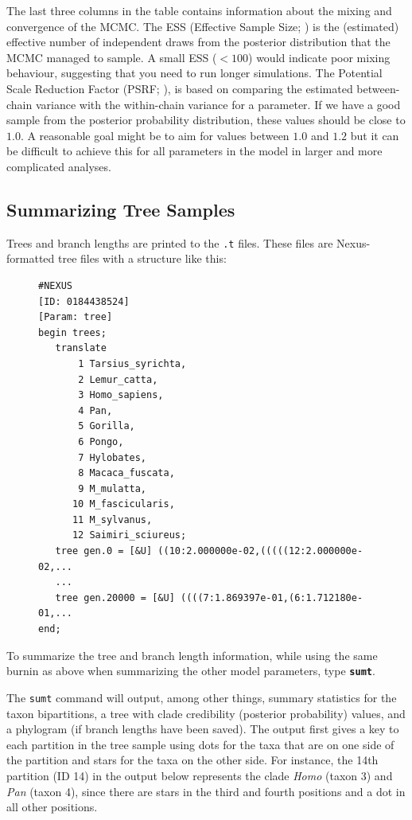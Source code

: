 \documentclass[12pt]{book}
\newcommand{\ttt}[1]{\texttt{#1}}
\newcommand{\tb}[1]{\ttt{\textbf{#1}}}
\begin{document}
The last three columns in the table contains information about the mixing and convergence of the
MCMC. The ESS (Effective Sample Size; \citet{ripley87}) is the (estimated) effective number of
independent draws from the posterior distribution that the MCMC managed to sample. A small ESS
($<100$) would indicate poor mixing behaviour, suggesting that you need to run longer simulations.
The Potential Scale Reduction Factor (PSRF; \citet{gelman92}), is based on comparing the estimated
between-chain variance with the within-chain variance for a parameter. If we have a good sample
from the posterior probability distribution, these values should be close to $1.0$. A reasonable
goal might be to aim for values between $1.0$ and $1.2$ but it can be difficult to achieve this
for all parameters in the model in larger and more complicated analyses.

\subsection{Summarizing Tree Samples}

Trees and branch lengths are printed to the \texttt{.t} files. These files are Nexus-formatted tree
files with a structure like this:

\begin{figure}[H]
\centering
\begin{BVerbatim}
#NEXUS
[ID: 0184438524]
[Param: tree]
begin trees;
   translate
       1 Tarsius_syrichta,
       2 Lemur_catta,
       3 Homo_sapiens,
       4 Pan,
       5 Gorilla,
       6 Pongo,
       7 Hylobates,
       8 Macaca_fuscata,
       9 M_mulatta,
      10 M_fascicularis,
      11 M_sylvanus,
      12 Saimiri_sciureus;
   tree gen.0 = [&U] ((10:2.000000e-02,(((((12:2.000000e-02,...
   ...
   tree gen.20000 = [&U] ((((7:1.869397e-01,(6:1.712180e-01,...
end;
\end{BVerbatim}
\end{figure}

To summarize the tree and branch length information, while using the same burnin as above when
summarizing the other model parameters, type \tb{sumt}.

The \texttt{sumt} command will output, among other things, summary statistics for the taxon
bipartitions, a tree with clade credibility (posterior probability) values, and a phylogram (if
branch lengths have been saved). The output first gives a key to each partition in the tree sample
using dots for the taxa that are on one side of the partition and stars for the taxa on the other
side. For instance, the 14th partition (ID 14) in the output below represents the clade
\textit{Homo} (taxon 3) and \textit{Pan} (taxon 4), since there are stars in the third and fourth
positions and a dot in all other positions.
\end{document}

